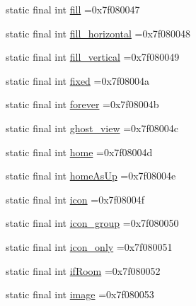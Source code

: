 \begin{DoxyCompactItemize}
static final int \mbox{\hyperlink{classbr_1_1unb_1_1cic_1_1mp_1_1marketmaster_1_1test_1_1R_1_1id_ae3e4eb22ee39593c8f6f100630654f36}{fill}} =0x7f080047
\item 
static final int \mbox{\hyperlink{classbr_1_1unb_1_1cic_1_1mp_1_1marketmaster_1_1test_1_1R_1_1id_a4a933d062ad369ac4bb6e0a52f05dd28}{fill\+\_\+horizontal}} =0x7f080048
\item 
static final int \mbox{\hyperlink{classbr_1_1unb_1_1cic_1_1mp_1_1marketmaster_1_1test_1_1R_1_1id_a5209f35bfbd8c69d004acf3978292d81}{fill\+\_\+vertical}} =0x7f080049
\item 
static final int \mbox{\hyperlink{classbr_1_1unb_1_1cic_1_1mp_1_1marketmaster_1_1test_1_1R_1_1id_ad0e70c3d2ce23013043536c574170e19}{fixed}} =0x7f08004a
\item 
static final int \mbox{\hyperlink{classbr_1_1unb_1_1cic_1_1mp_1_1marketmaster_1_1test_1_1R_1_1id_ac512cdf5ca633d7fb36da949b57870ff}{forever}} =0x7f08004b
\item 
static final int \mbox{\hyperlink{classbr_1_1unb_1_1cic_1_1mp_1_1marketmaster_1_1test_1_1R_1_1id_aa6b50605d209e816585420e5f99494de}{ghost\+\_\+view}} =0x7f08004c
\item 
static final int \mbox{\hyperlink{classbr_1_1unb_1_1cic_1_1mp_1_1marketmaster_1_1test_1_1R_1_1id_ac2b229213b84175c4c29522f6da39732}{home}} =0x7f08004d
\item 
static final int \mbox{\hyperlink{classbr_1_1unb_1_1cic_1_1mp_1_1marketmaster_1_1test_1_1R_1_1id_a295946b476f9ab55055a5962a70935ca}{home\+As\+Up}} =0x7f08004e
\item 
static final int \mbox{\hyperlink{classbr_1_1unb_1_1cic_1_1mp_1_1marketmaster_1_1test_1_1R_1_1id_ae04421e3f8cd049fb3be1768bd3bf136}{icon}} =0x7f08004f
\item 
static final int \mbox{\hyperlink{classbr_1_1unb_1_1cic_1_1mp_1_1marketmaster_1_1test_1_1R_1_1id_a5140a6ebc2178675f6ed4b9730cbdffc}{icon\+\_\+group}} =0x7f080050
\item 
static final int \mbox{\hyperlink{classbr_1_1unb_1_1cic_1_1mp_1_1marketmaster_1_1test_1_1R_1_1id_a29501beeacb24bb3a8e0a078d3224493}{icon\+\_\+only}} =0x7f080051
\item 
static final int \mbox{\hyperlink{classbr_1_1unb_1_1cic_1_1mp_1_1marketmaster_1_1test_1_1R_1_1id_abd448a26502f2509c618afe7ab6d1b92}{if\+Room}} =0x7f080052
\item 
static final int \mbox{\hyperlink{classbr_1_1unb_1_1cic_1_1mp_1_1marketmaster_1_1test_1_1R_1_1id_a01e2f6911d0d4af51872c89a9e027a31}{image}} =0x7f080053

\end{DoxyCompactItemize}
